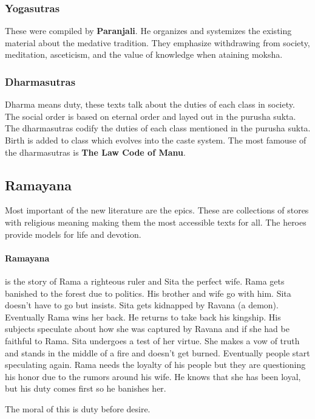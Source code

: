 \documentclass{article}
\begin{document}
\subsubsection*{Yogasutras}
\label{sub:yogasutras}
These were compiled by \textbf{Paranjali}. He organizes and systemizes the existing material about the medative tradition. They emphasize withdrawing from society, meditation, asceticism, and the value of knowledge when ataining moksha.

\subsubsection*{Dharmasutras}
\label{sub:dharmasutras}
Dharma means duty, these texts talk about the duties of each class in society. The social order is based on eternal order and layed out in the purusha sukta. The dharmasutras codify the duties of each class mentioned in the purusha sukta. Birth is added to class which evolves into the caste system. The most famouse of the dharmasutras is \textbf{The Law Code of Manu}.


\subsection*{Ramayana}
\label{sec:ramayana}
Most important of the new literature are the epics. These are collections of stores with religious meaning making them the most accessible texts for all. The heroes provide models for life and devotion.

\paragraph{Ramayana}
 \label{par:ramayana}
is the story of Rama a righteous ruler and Sita the perfect wife. Rama gets banished to the forest due to politics. His brother and wife go with him. Sita doesn't have to go but insists. Sita gets kidnapped by Ravana (a demon). Eventually Rama wins her back. He returns to take back his kingship. His subjects speculate about how she was captured by Ravana and if she had be faithful to Rama. Sita undergoes a test of her virtue. She makes a vow of truth and stands in the middle of a fire and doesn't get burned. Eventually people start speculating again. Rama needs the loyalty of his people but they are questioning his honor due to the rumors around his wife. He knows that she has been loyal, but his duty comes first so he banishes her.

The moral of this is duty before desire.
\end{document}
